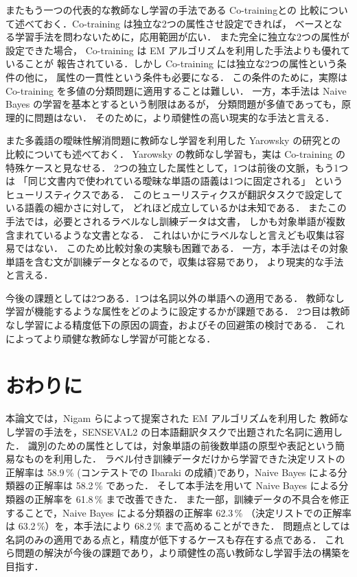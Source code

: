 またもう一つの代表的な教師なし学習の手法である Co-training\cite{blum98}との
比較について述べておく．Co-training は独立な2つの属性させ設定できれば，
ベースとなる学習手法を問わないために，応用範囲が広い．
また完全に独立な2つの属性が設定できた場合，
Co-training は EM アルゴリズムを利用した手法よりも優れていることが
報告されている\cite{nigam00-2}．しかし Co-training には独立な2つの属性という条件の他に，
属性の一貫性という条件も必要になる．
この条件のために，実際は Co-training を多値の分類問題に適用することは難しい\cite{shinnou-sen2}．
一方，本手法は Naive Bayes の学習を基本とするという制限はあるが，
分類問題が多値であっても，原理的に問題はない．
そのために，より頑健性の高い現実的な手法と言える．

また多義語の曖昧性解消問題に教師なし学習を利用した Yarowsky の研究\cite{Yarowsky2}との
比較についても述べておく．
Yarowsky の教師なし学習も，実は Co-training の特殊ケースと見なせる\cite{blum98}．
2つの独立した属性として，1つは前後の文脈，もう1つは
「同じ文書内で使われている曖昧な単語の語義は1つに固定される」
というヒューリスティクスである．
このヒューリスティクスが翻訳タスクで設定している語義の細かさに対して，
どれほど成立しているかは未知である．
またこの手法では，必要とされるラベルなし訓練データは文書，
しかも対象単語が複数含まれているような文書となる．
これはいかにラベルなしと言えども収集は容易ではない．
このため比較対象の実験も困難である．
一方，本手法はその対象単語を含む文が訓練データとなるので，収集は容易であり，
より現実的な手法と言える．

今後の課題としては2つある．1つは名詞以外の単語への適用である．
教師なし学習が機能するような属性をどのように設定するかが課題である．
2つ目は教師なし学習による精度低下の原因の調査，およびその回避策の検討である．
これによってより頑健な教師なし学習が可能となる．


\section{おわりに}


本論文では，Nigam らによって提案された EM アルゴリズムを利用した
教師なし学習の手法を，SENSEVAL2 の日本語翻訳タスクで出題された名詞に適用した．
識別のための属性としては，対象単語の前後数単語の原型や表記という簡易なものを利用した．
ラベル付き訓練データだけから学習できた決定リストの正解率は
58.9\,\% (コンテストでの Ibaraki の成績)であり，Naive Bayes による分類器の正解率は 58.2\,\% であった．
そして本手法を用いて Naive Bayes による分類器の正解率を 61.8\,\% まで改善できた．
また一部，訓練データの不具合を修正することで，Naive Bayes による分類器の正解率 62.3\,\% 
（決定リストでの正解率は 63.2\,\%）を，本手法により 68.2\,\% まで高めることができた．
問題点としては名詞のみの適用である点と，精度が低下するケースも存在する点である．
これら問題の解決が今後の課題であり，より頑健性の高い教師なし学習手法の構築を目指す．



